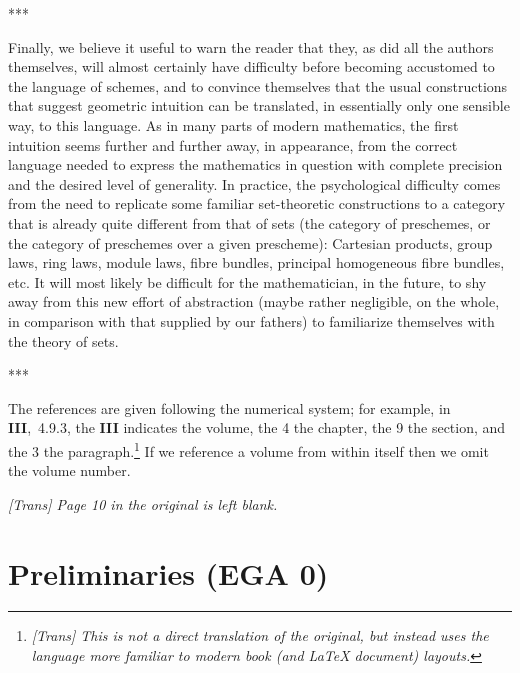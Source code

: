 \documentclass[openany,oneside]{amsbook}
\theoremstyle{ega-env-style}
\theoremstyle{ega-thm-env-style}
\theoremstyle{ega-defn-env-style}
\newcommand{\oldpage}[2][]{{\marginnote{\normalfont{\textbf{#1}~|~#2}}}\ignorespaces}
\def\sectionbreak{\begin{center}***\end{center}}
\begin{document}
\sectionbreak

Finally, we believe it useful to warn the reader that they, as did all the authors themselves, will almost certainly have difficulty before becoming accustomed to the language of schemes, and to convince themselves that the usual constructions that suggest geometric intuition can be translated, in essentially only one sensible way, to this language.
As in many parts of modern mathematics, the first intuition seems further and further away, in appearance, from the correct language needed to express the mathematics in question with complete precision and the desired level of generality.
In practice, the psychological difficulty comes from the need to replicate some familiar set-theoretic constructions to a category that is already quite different from that of sets (the category of preschemes, or the category of preschemes over a given prescheme): Cartesian products, group laws, ring laws, module laws, fibre bundles, principal homogeneous fibre bundles, etc.
It will most likely be difficult for the mathematician, in the future, to shy away from this new effort of abstraction (maybe rather negligible, on the whole, in comparison with that supplied by our fathers) to familiarize themselves with the theory of sets.

\sectionbreak

The references are given following the numerical system; for example, in \textbf{III},~4.9.3, the \textbf{III} indicates the volume, the 4 the chapter, the 9 the section, and the 3 the paragraph.\footnote{\emph{[Trans] This is not a direct translation of the original, but instead uses the language more familiar to modern book (and \LaTeX{} document) layouts.}}
If we reference a volume from within itself then we omit the volume number.

\bigskip

\oldpage[I]{10}
\emph{[Trans] Page 10 in the original is left blank.}




\setcounter{chapter}{-1}\chapter{Preliminaries (EGA 0)}

\label{section:ega0}

























\end{document}
